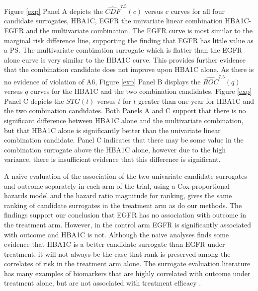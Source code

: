 \documentclass[times, doublespace]{simauth}
\begin{document}
Figure \ref{exp} Panel A depicts the $\widehat{CDF}^{7.5}(c)$ versus $c$ curves for all four candidate surrogates, HBA1C, EGFR the univariate linear combination HBA1C-EGFR and the multivariate combination. The EGFR curve is most similar to the marginal risk difference line, supporting the finding that EGFR has little value as a PS. The multivariate combination surrogate which is flatter than the EGFR alone curve is very similar to the HBA1C curve. This provides further evidence that the combination candidate does not improve upon HBA1C alone. As there is no evidence of violation of A6, Figure \ref{exp} Panel B displays the $\widehat{ROC}^{7.5}(q)$ versus $q$ curves for the HBA1C and the two combination candidates. Figure \ref{exp} Panel C depicts the $STG(t)$ versus $t$ for $t$ greater than one year for HBA1C and the two combination candidates. Both Panels A and C support that there is no significant difference between HBA1C alone and the multivariate combination, but that HBA1C alone is significantly better than the univariate linear combination candidate. Panel C indicates that there may be some value in the combination surrogate above the HBA1C alone, however due to the high variance, there is insufficient evidence that this difference is significant. 

A naive evaluation of the association of the two univariate candidate surrogates and outcome separately in each arm of the trial, using a Cox proportional hazards model and the hazard ratio magnitude for ranking, gives the same ranking of candidate surrogates in the treatment arm as do our methods. The findings support our conclusion that EGFR has no association with outcome in the treatment arm. However, in the control arm EGFR is significantly associated with outcome and HBA1C is not. Although the naive analyses finds some evidence that HBA1C is a better candidate surrogate than EGFR under treatment, it will not always be the case that rank is preserved among the correlates of risk in the treatment arm alone. The surrogate evaluation literature has many examples of biomarkers that are highly correlated with outcome under treatment alone, but are not associated with treatment efficacy \citep{flemming96}.  
\end{document}
